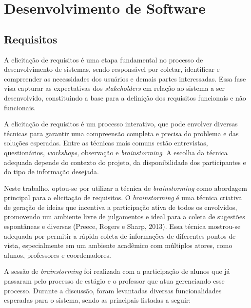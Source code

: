 \chapter{Desenvolvimento de Software}

\section*{Requisitos}

A elicitação de requisitos é uma etapa fundamental no processo de desenvolvimento de sistemas, sendo responsável por coletar, identificar e compreender as necessidades dos usuários e demais partes interessadas. Essa fase visa capturar as expectativas dos \textit{stakeholders} em relação ao sistema a ser desenvolvido, constituindo a base para a definição dos requisitos funcionais e não funcionais.

A elicitação de requisitos é um processo interativo, que pode envolver diversas técnicas para garantir uma compreensão completa e precisa do problema e das soluções esperadas. Entre as técnicas mais comuns estão entrevistas, questionários, \textit{workshops}, observação e \textit{brainstorming}. A escolha da técnica adequada depende do contexto do projeto, da disponibilidade dos participantes e do tipo de informação desejada.

Neste trabalho, optou-se por utilizar a técnica de \textit{brainstorming} como abordagem principal para a elicitação de requisitos. O \textit{brainstorming} é uma técnica criativa de geração de ideias que incentiva a participação ativa de todos os envolvidos, promovendo um ambiente livre de julgamentos e ideal para a coleta de sugestões espontâneas e diversas (Preece, Rogers e Sharp, 2013). Essa técnica mostrou-se adequada por permitir a rápida coleta de informações de diferentes pontos de vista, especialmente em um ambiente acadêmico com múltiplos atores, como alunos, professores e coordenadores.

A sessão de \textit{brainstorming} foi realizada com a participação de alunos que já passaram pelo processo de estágio e o professor que atua gerenciando esse processo. Durante a discussão, foram levantadas diversas funcionalidades esperadas para o sistema, sendo as principais listadas a seguir:


